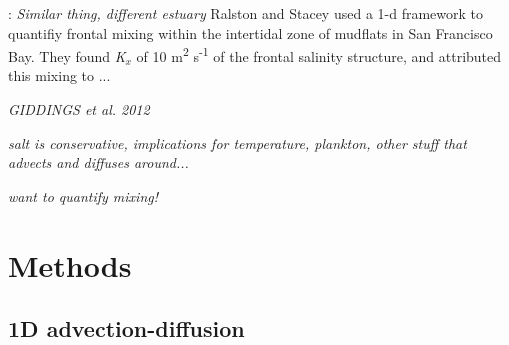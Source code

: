 \parencite{Ralston:2005aa}: \emph{Similar thing, different estuary}
Ralston and Stacey \cite{Ralston:2005aa} used a 1-d framework to quantifiy frontal mixing within the intertidal zone of mudflats in San Francisco Bay. They found \emph{K$_x$} of 10 m\textsuperscript{2} s\textsuperscript{-1} of the frontal salinity structure, and attributed this mixing to ...








\emph{GIDDINGS et al. 2012} 





















\emph{salt is conservative, implications for temperature, plankton, other stuff that advects and diffuses around...}

\emph{want to quantify mixing!}


\section{Methods} \label{sec:ch4methods}

\subsection{1D advection-diffusion} \label{ssec:1dadvdif}

